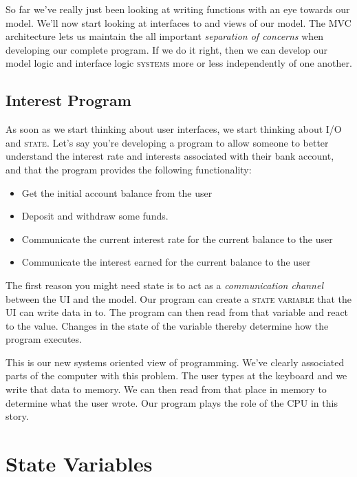 \documentclass[]{tufte-handout}
\begin{document}
So far we've really just been looking at writing functions with an eye towards our model. We'll now start looking at interfaces to and views of our model. The MVC architecture lets us maintain the all important \textit{separation of concerns} when developing our complete program. If we do it right, then we can develop our model logic and interface logic \textsc{systems} more or less independently of one another.

\subsection{Interest Program}

As soon as we start thinking about user interfaces, we start thinking about \textsc{I/O} and \textsc{state}. Let's say you're developing a program to allow someone to better understand the interest rate and interests associated with their bank account, and that the program provides the following functionality: 
\begin{itemize}
\item Get the initial account balance from the user
\item Deposit and withdraw some funds.
\item Communicate the current interest rate for the current balance to the user
\item Communicate the interest earned for the current balance to the user
\end{itemize}
The first reason you might need state is to act as a \textit{communication channel} between the UI and the model. Our program can create a \textsc{state variable} that the UI can write data in to.  The program can then read from that variable and react to the value. Changes in the state of the variable thereby determine how the program executes. 

This is our new systems oriented view of programming. We've clearly associated parts of the computer with this problem. The user types at the keyboard and we write that data to  memory. We can then read from that place in memory to determine what the user wrote. Our program plays the role of the CPU in this story. 


\section{State Variables}
\end{document}
